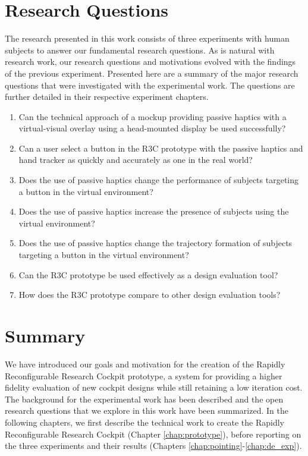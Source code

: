 \section{Research Questions}
\label{sec:intro_questions}

The research presented in this work consists of three experiments with human subjects to answer our fundamental research questions.
As is natural with research work, our research questions and motivations evolved with the findings of the previous experiment.
Presented here are a summary of the major research questions that were investigated with the experimental work.
The questions are further detailed in their respective experiment chapters.

\begin{enumerate}
    \item Can the technical approach of a mockup providing passive haptics with a virtual-visual overlay using a head-mounted display be used successfully?
    \item Can a user select a button in the R3C prototype with the passive haptics and hand tracker as quickly and accurately as one in the real world?
    \item Does the use of passive haptics change the performance of subjects targeting a button in the virtual environment?
    \item Does the use of passive haptics increase the presence of subjects using the virtual environment?
    \item Does the use of passive haptics change the trajectory formation of subjects targeting a button in the virtual environment?
    \item Can the R3C prototype be used effectively as a design evaluation tool?
    \item How does the R3C prototype compare to other design evaluation tools?
\end{enumerate}

\section{Summary}

We have introduced our goals and motivation for the creation of the Rapidly Reconfigurable Research Cockpit prototype, a system for providing a higher fidelity evaluation of new cockpit designs while still retaining a low iteration cost.
The background for the experimental work has been described and the open research questions that we explore in this work have been summarized.
In the following chapters, we first describe the technical work to create the Rapidly Reconfigurable Research Cockpit (Chapter \ref{chap:prototype}), before reporting on the three experiments and their results (Chapters \ref{chap:pointing}-\ref{chap:de_exp}).
